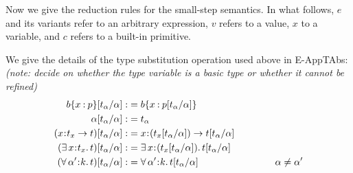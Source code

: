 \documentclass[11pt]{article}
\newcommand{\al}{\alpha}
\newcommand{\bind}{\hspace{0.05em}{:}\hspace{0.05em}} %
\newcommand{\col}{\mathbin{:}}       %
\newcommand{\step}{\hookrightarrow}
\newcommand{\existype}[3]{\exists\, #1\bind #2.\, #3}
\newcommand{\polytype}[3]{\forall\, #1\bind #2.\, #3}
\newcommand{\functype}[3]{#1\bind #2 \rightarrow #3}
\newcommand{\letin}[3]{{\tt let}\,#1\hspace{0.1em}{=}\hspace{0.1em}#2\,{\tt in}\,#3}
\begin{document}
Now we give the reduction rules for the small-step semantics. In what follows, $e$ and its variants refer to an arbitrary expression, $v$ refers to a value, $x$ to a variable, and $c$  refers to a built-in primitive.  

We give the details of the type substitution operation used above in {\sc E-AppTAbs}: {\em (note: decide on whether the type variable is a basic type or whether it  cannot be refined)}
\begin{align*}
b\{x\col p\}[t_\al/\al] :&= b\{x\col p[t_\al/\al]\} \\
\al[t_\al/\al] :&= t_\al \\
(\functype{x}{t_x}{t})[t_\al/\al] :&= \functype{x}{(t_x[t_\al/\al])}{t[t_\al/\al]} \\
(\existype{x}{t_x}{t})[t_\al/\al] :&= \existype{x}{(t_x[t_\al/\al])}{t[t_\al/\al]} \\
(\polytype{\al'}{k}{t})[t_\al/\al] :&= \polytype{\al'}{k}{t[t_\al/\al]} \quad\quad\quad\quad\quad\quad\quad\quad \al \neq \al'
\end{align*}
\end{document}
